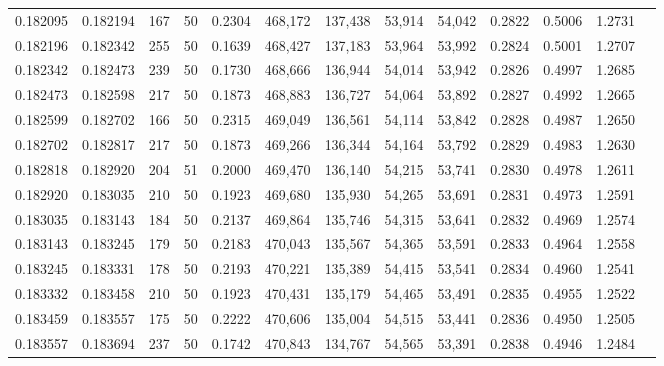 \begin{tabular}{rrrrrrrrrrrrr}
0.182095 & 0.182194 &   167 &  50 &                                     0.2304 & 468,172 & 137,438 &  53,914 &  54,042 & 0.2822 & 0.5006 & 1.2731 \\
0.182196 & 0.182342 &   255 &  50 &                                     0.1639 & 468,427 & 137,183 &  53,964 &  53,992 & 0.2824 & 0.5001 & 1.2707 \\
0.182342 & 0.182473 &   239 &  50 &                                     0.1730 & 468,666 & 136,944 &  54,014 &  53,942 & 0.2826 & 0.4997 & 1.2685 \\
0.182473 & 0.182598 &   217 &  50 &                                     0.1873 & 468,883 & 136,727 &  54,064 &  53,892 & 0.2827 & 0.4992 & 1.2665 \\
0.182599 & 0.182702 &   166 &  50 &                                     0.2315 & 469,049 & 136,561 &  54,114 &  53,842 & 0.2828 & 0.4987 & 1.2650 \\
0.182702 & 0.182817 &   217 &  50 &                                     0.1873 & 469,266 & 136,344 &  54,164 &  53,792 & 0.2829 & 0.4983 & 1.2630 \\
0.182818 & 0.182920 &   204 &  51 &                                     0.2000 & 469,470 & 136,140 &  54,215 &  53,741 & 0.2830 & 0.4978 & 1.2611 \\
0.182920 & 0.183035 &   210 &  50 &                                     0.1923 & 469,680 & 135,930 &  54,265 &  53,691 & 0.2831 & 0.4973 & 1.2591 \\
0.183035 & 0.183143 &   184 &  50 &                                     0.2137 & 469,864 & 135,746 &  54,315 &  53,641 & 0.2832 & 0.4969 & 1.2574 \\
0.183143 & 0.183245 &   179 &  50 &                                     0.2183 & 470,043 & 135,567 &  54,365 &  53,591 & 0.2833 & 0.4964 & 1.2558 \\
0.183245 & 0.183331 &   178 &  50 &                                     0.2193 & 470,221 & 135,389 &  54,415 &  53,541 & 0.2834 & 0.4960 & 1.2541 \\
0.183332 & 0.183458 &   210 &  50 &                                     0.1923 & 470,431 & 135,179 &  54,465 &  53,491 & 0.2835 & 0.4955 & 1.2522 \\
0.183459 & 0.183557 &   175 &  50 &                                     0.2222 & 470,606 & 135,004 &  54,515 &  53,441 & 0.2836 & 0.4950 & 1.2505 \\
0.183557 & 0.183694 &   237 &  50 &                                     0.1742 & 470,843 & 134,767 &  54,565 &  53,391 & 0.2838 & 0.4946 & 1.2484 \\

\end{tabular}
